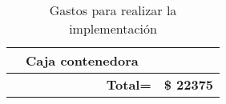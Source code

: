 \begin{table}[H]
\begin{tabular}{|r|l|r|r|}
		\multicolumn{1}{|l|}{} & Caja contenedora & \multicolumn{1}{l|}{} & \multicolumn{1}{l|}{} \\ \hline
		\multicolumn{3}{|r|}{\textbf{Total=}} & \multicolumn{1}{c|}{\textbf{\$ 22375}} \\ \hline
	\end{tabular}
\caption{Gastos para realizar la implementación}
\label{gastos}

\end{table}
%
%
%

